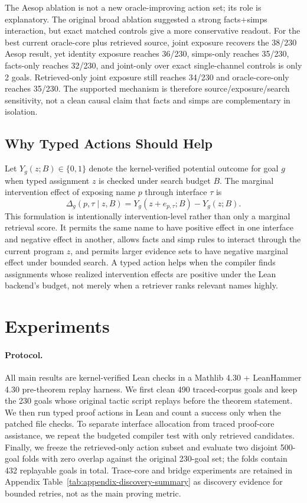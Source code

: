 \documentclass{article}
\begin{document}
The Aesop ablation is not a new oracle-improving action set; its role is explanatory. The original broad ablation suggested a strong facts+simps interaction, but exact matched controls give a more conservative readout. For the best current oracle-core plus retrieved source, joint exposure recovers the 38/230 Aesop result, yet identity exposure reaches 36/230, simps-only reaches 35/230, facts-only reaches 32/230, and joint-only over exact single-channel controls is only 2 goals. Retrieved-only joint exposure still reaches 34/230 and oracle-core-only reaches 35/230. The supported mechanism is therefore source/exposure/search sensitivity, not a clean causal claim that facts and simps are complementary in isolation.

\subsection{Why Typed Actions Should Help}

Let $Y_g(z;B)\in\{0,1\}$ denote the kernel-verified potential outcome for goal $g$ when typed assignment $z$ is checked under search budget $B$. The marginal intervention effect of exposing name $p$ through interface $\tau$ is
\[
\Delta_g(p,\tau\mid z,B)=Y_g(z+e_{p,\tau};B)-Y_g(z;B).
\]
This formulation is intentionally intervention-level rather than only a marginal retrieval score. It permits the same name to have positive effect in one interface and negative effect in another, allows facts and simp rules to interact through the current program $z$, and permits larger evidence sets to have negative marginal effect under bounded search. A typed action helps when the compiler finds assignments whose realized intervention effects are positive under the Lean backend's budget, not merely when a retriever ranks relevant names highly.

\section{Experiments}

\paragraph{Protocol.}
All main results are kernel-verified Lean checks in a Mathlib 4.30 + LeanHammer 4.30 pre-theorem replay harness. We first clean 490 traced-corpus goals and keep the 230 goals whose original tactic script replays before the theorem statement. We then run typed proof actions in Lean and count a success only when the patched file checks. To separate interface allocation from traced proof-core assistance, we repeat the budgeted compiler test with only retrieved candidates. Finally, we freeze the retrieved-only action subset and evaluate two disjoint 500-goal folds with zero overlap against the original 230-goal set; the folds contain 432 replayable goals in total. Trace-core and bridge experiments are retained in Appendix Table~\ref{tab:appendix-discovery-summary} as discovery evidence for bounded retries, not as the main proving metric.
\end{document}
